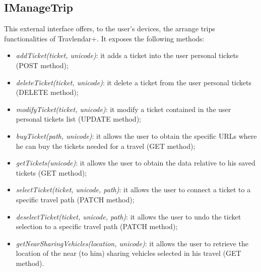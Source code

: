 \subsection{IManageTrip}
\label{subsect:IManageTrip}
This external interface offers, to the user's devices, the arrange trips functionalities of Travlendar+. It exposes the following methods:
\begin{itemize}
	\item \textit{addTicket(ticket, unicode)}: it adds a ticket into the user personal tickets (POST method);
	\item \textit{deleteTicket(ticket, unicode)}: it delete a ticket from the user personal tickets (DELETE method);
	\item \textit{modifyTicket(ticket, unicode)}: it modify a ticket contained in the user personal tickets list (UPDATE method);
	\item \textit{buyTicket(path, unicode)}: it allows the user to obtain the specific URLs where he can buy the tickets needed for a travel (GET method);
	\item \textit{getTickets(unicode)}: it allows the user to obtain the data relative to his saved tickets (GET method);
	\item \textit{selectTicket(ticket, unicode, path)}: it allows the user to connect a ticket to a specific travel path (PATCH method);
	\item \textit{deselectTicket(ticket, unicode, path)}: it allows the user to undo the ticket selection to a specific travel path (PATCH method);
	\item \textit{getNearSharingVehicles(location, unicode)}: it allows the user to retrieve the location of the near (to him) sharing vehicles selected in his travel (GET method).
\end{itemize}

